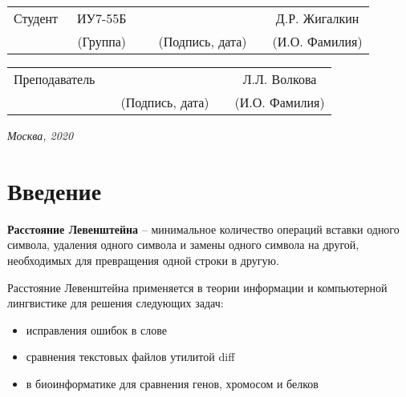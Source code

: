 \documentclass[utf8x, 12pt]{G7-32}
\begin{document}
\vspace{1.5cm}
\noindent
\begin{tabular}{l c c c c c}
    Студент      & ~ИУ7-55Б~               & \hspace{3.5cm} & \hspace{3.5cm}                 & &  Д.Р. Жигалкин \\\cline{2-2}\cline{4-4} \cline{6-6} 
    \hspace{3cm} & {\footnotesize(Группа)} &                & {\footnotesize(Подпись, дата)} & & {\footnotesize(И.О. Фамилия)}
\end{tabular}

\vspace{1cm}

\noindent
\begin{tabular}{l c c c c}
    Преподаватель & \hspace{6cm}   & \hspace{3.5cm}                 & & Л.Л. Волкова \\\cline{3-3} \cline{5-5} 
    \hspace{3cm}  &                & {\footnotesize(Подпись, дата)} & & {\footnotesize(И.О. Фамилия)}
\end{tabular}

\begin{center}	
	\vfill
	\large \textit {Москва, 2020}
\end{center}

\thispagestyle {empty}
\pagebreak

\tableofcontents

\newpage
\chapter*{Введение}
\textbf{Расстояние Левенштейна} -- минимальное количество операций вставки одного символа, удаления одного символа и замены одного символа на другой, необходимых для превращения одной строки в другую.

Расстояние Левенштейна применяется в теории информации и компьютерной лингвистике для решения следующих задач:

\begin{itemize}
	\item исправления ошибок в слове
	\item сравнения текстовых файлов утилитой diff
	\item в биоинформатике для сравнения генов, хромосом и белков
\end{itemize}
\end{document}
